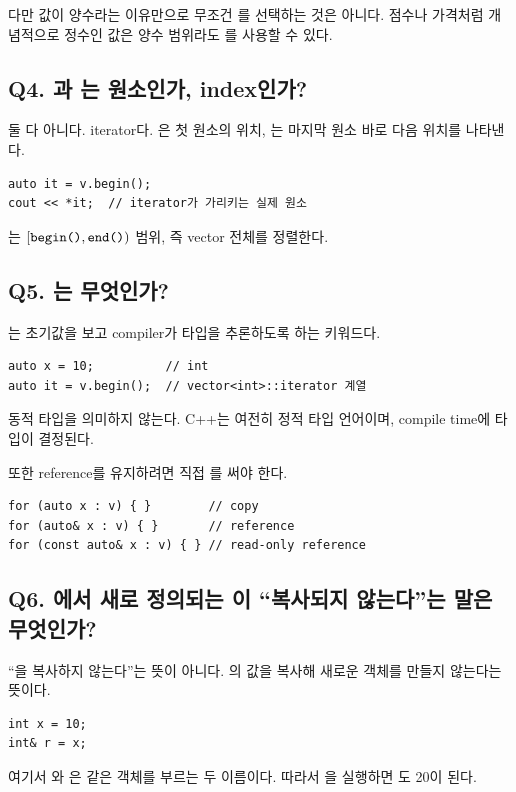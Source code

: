 다만 값이 양수라는 이유만으로 무조건 를 선택하는 것은 아니다. 점수나 가격처럼 개념적으로 정수인 값은 양수 범위라도 를 사용할 수 있다.

\subsection{Q4. 과 는 원소인가, index인가?}
둘 다 아니다. iterator다. 은 첫 원소의 위치, 는 마지막 원소 바로 다음 위치를 나타낸다.

\begin{lstlisting}
auto it = v.begin();
cout << *it;  // iterator가 가리키는 실제 원소
\end{lstlisting}

는 $[\texttt{begin()},\texttt{end()})$ 범위, 즉 vector 전체를 정렬한다.

\subsection{Q5. 는 무엇인가?}
는 초기값을 보고 compiler가 타입을 추론하도록 하는 키워드다.
\begin{lstlisting}
auto x = 10;          // int
auto it = v.begin();  // vector<int>::iterator 계열
\end{lstlisting}

동적 타입을 의미하지 않는다. C++는 여전히 정적 타입 언어이며, compile time에 타입이 결정된다.

또한 reference를 유지하려면 직접 \code{\&}를 써야 한다.
\begin{lstlisting}
for (auto x : v) { }        // copy
for (auto& x : v) { }       // reference
for (const auto& x : v) { } // read-only reference
\end{lstlisting}

\subsection{Q6. 에서 새로 정의되는 이 ``복사되지 않는다''는 말은 무엇인가?}
``을 복사하지 않는다''는 뜻이 아니다. 의 값을 복사해 새로운  객체를 만들지 않는다는 뜻이다.

\begin{lstlisting}
int x = 10;
int& r = x;
\end{lstlisting}

여기서 와 은 같은  객체를 부르는 두 이름이다. 따라서 을 실행하면 도 20이 된다.

